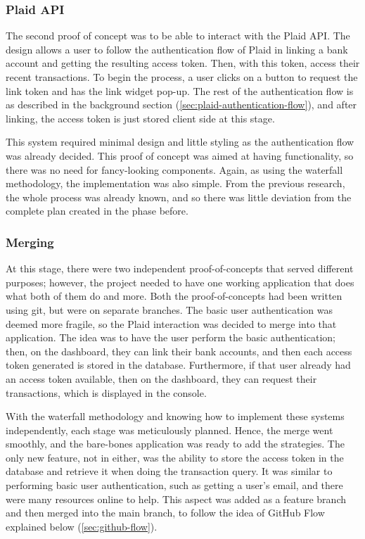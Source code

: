 \subsubsection{Plaid API}
The second proof of concept was to be able to interact with the Plaid API. The design allows a user to follow the authentication flow of Plaid in linking a bank account and getting the resulting access token. Then, with this token, access their recent transactions. To begin the process, a user clicks on a button to request the link token and has the link widget pop-up. The rest of the authentication flow is as described in the background section (\ref{sec:plaid-authentication-flow}), and after linking, the access token is just stored client side at this stage.

This system required minimal design and little styling as the authentication flow was already decided. This proof of concept was aimed at having functionality, so there was no need for fancy-looking components. Again, as using the waterfall methodology, the implementation was also simple. From the previous research, the whole process was already known, and so there was little deviation from the complete plan created in the phase before.

\subsubsection{Merging}
At this stage, there were two independent proof-of-concepts that served different purposes; however, the project needed to have one working application that does what both of them do and more. Both the proof-of-concepts had been written using git, but were on separate branches. The basic user authentication was deemed more fragile, so the Plaid interaction was decided to merge into that application. The idea was to have the user perform the basic authentication; then, on the dashboard, they can link their bank accounts, and then each access token generated is stored in the database. Furthermore, if that user already had an access token available, then on the dashboard, they can request their transactions, which is displayed in the console.

With the waterfall methodology and knowing how to implement these systems independently, each stage was meticulously planned. Hence, the merge went smoothly, and the bare-bones application was ready to add the strategies. The only new feature, not in either, was the ability to store the access token in the database and retrieve it when doing the transaction query. It was similar to performing basic user authentication, such as getting a user's email, and there were many resources online to help. This aspect was added as a feature branch and then merged into the main branch, to follow the idea of GitHub Flow explained below (\ref{sec:github-flow}).

